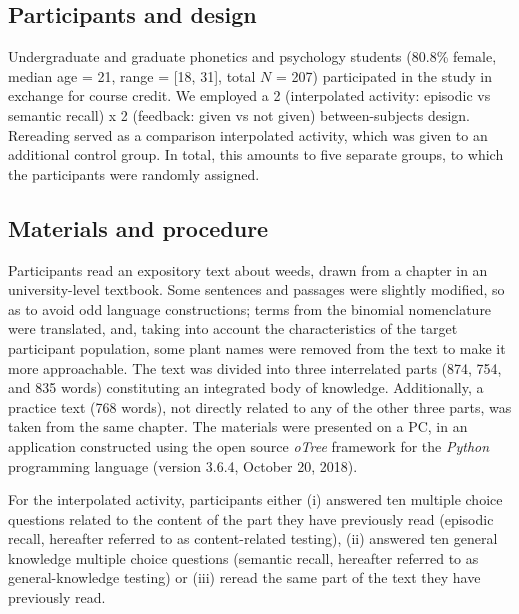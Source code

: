

\hypertarget{participants-and-design}{%
\subsection{Participants and design}\label{participants-and-design}}

Undergraduate and graduate phonetics and psychology students (80.8\%
female, median age = 21, range = {[}18, 31{]}, total \(N\) = 207)
participated in the study in exchange for course credit. We employed a 2
(interpolated activity: episodic vs semantic recall) x 2 (feedback:
given vs not given) between-subjects design. Rereading served as a
comparison interpolated activity, which was given to an additional
control group. In total, this amounts to five separate groups, to which
the participants were randomly assigned.

\hypertarget{materials-and-procedure}{%
\subsection{Materials and procedure}\label{materials-and-procedure}}

Participants read an expository text about weeds, drawn from a chapter
in an university-level textbook. Some sentences and passages were
slightly modified, so as to avoid odd language constructions; terms from
the binomial nomenclature were translated, and, taking into account the
characteristics of the target participant population, some plant names
were removed from the text to make it more approachable. The text was
divided into three interrelated parts (874, 754, and 835 words)
constituting an integrated body of knowledge. Additionally, a practice
text (768 words), not directly related to any of the other three parts,
was taken from the same chapter. The materials were presented on a PC,
in an application constructed using the open source \textit{oTree}
framework \citep[version 2.1.35,][]{chenOTreeOpensourcePlatform2016} for
the \textit{Python} programming language (version 3.6.4, October 20,
2018).

For the interpolated activity, participants either (i) answered ten
multiple choice questions related to the content of the part they have
previously read (episodic recall, hereafter referred to as
content-related testing), (ii) answered ten general knowledge multiple
choice questions (semantic recall, hereafter referred to as
general-knowledge testing) or (iii) reread the same part of the text
they have previously read.

